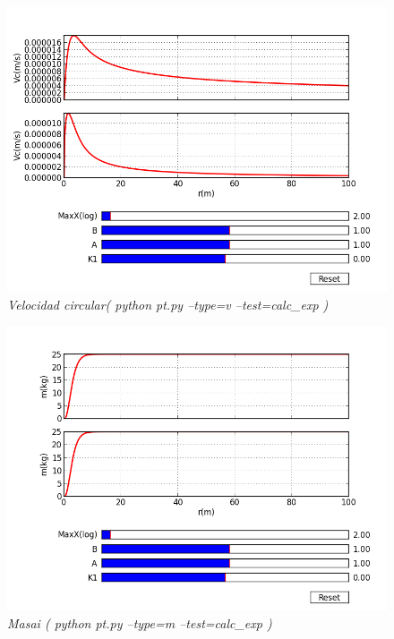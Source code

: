 \documentclass[12pt]{book}
\begin{document}
\begin{itemize}
\begin{figure}[!ht]
 \centering
 \includegraphics[scale=0.33]{pt_vc_A1_B1.png}
 \caption{\emph{Velocidad circular( python pt.py --type=v --test=calc\_exp )}}
\end{figure}

\begin{figure}[!ht]
 \centering
 \includegraphics[scale=0.33]{pt_m_compAn.png}
 \caption{\emph{Masai ( python pt.py --type=m --test=calc\_exp )}}
\end{figure}

\end{itemize}
\end{document}
